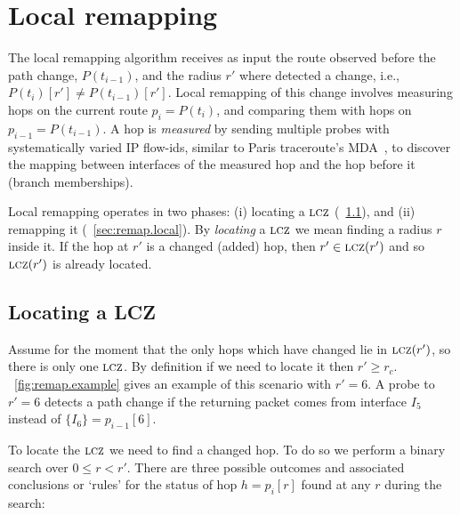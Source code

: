 \section{Local remapping}
\label{sec:remap}

\def\Pi{p_i}
\def\Pii{p_{i-1}}

The local remapping algorithm receives as input the route observed
before the path change, $P(t_{i-1})$, and the radius $r'$ where
\dtrack{} detected a change, i.e., $P(t_i)[r'] \ne P(t_{i-1})[r']$.
Local remapping of this change involves measuring hops on the current
route $\Pi=P(t_i)$, and comparing them with hops on
$\Pii\!=\!P(t_{i-1})$.  A hop is \emph{measured} by sending multiple
probes with systematically varied IP flow-ids, similar to Paris
traceroute's MDA~\cite{veitch09balancer}, to discover the mapping
between interfaces of the measured hop and the hop before it (branch
memberships).

Local remapping operates in two phases:  (i)  locating a $\mathrm{\textsc{lcz}}$
(\secstr~\ref{sec:remap.locate}), and (ii) remapping it
(\secstr~\ref{sec:remap.local}).  By \emph{locating} a $\mathrm{\textsc{lcz}}$ we mean
finding a radius $r$ inside it.  If the hop at $r'$ is a changed (added)
hop, then $r'\in\mathrm{\textsc{lcz}}(r')$ and so $\mathrm{\textsc{lcz}}(r')$ is already located.



\subsection{Locating a LCZ}
\label{sec:remap.locate}

Assume for the moment that the only hops which have changed lie in
$\mathrm{\textsc{lcz}}(r')$, so there is only one $\mathrm{\textsc{lcz}}$.  By definition if we need to
locate it then $r'\ge r_c$.  \figstr~\ref{fig:remap.example} gives an
example of this scenario with $r'=6$.  A probe to $r'=6$ detects a path
change if the returning packet comes from interface $I_5$ instead of
$\{I_6\} = \Pii[6]$.

To locate the $\mathrm{\textsc{lcz}}$ we need to find a changed hop.  To do so we perform
a binary search over  $0\le r <r'$.  There are three possible outcomes
and associated conclusions or `rules' for the status of hop $h =\Pi[r]$
found at any $r$ during the search:

